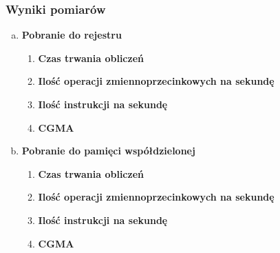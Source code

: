 \subsubsection{Wyniki pomiarów}

\begin{enumerate}[(a)]

\item \textbf{Pobranie do rejestru} \newline

\begin{enumerate}[1.]

\item \textbf{Czas trwania obliczeń} \newline

\item \textbf{Ilość operacji zmiennoprzecinkowych na sekundę} \newline

\item \textbf{Ilość instrukcji na sekundę} \newline

\item \textbf{CGMA} \newline

\end{enumerate}

\item \textbf{Pobranie do pamięci współdzielonej} \newline

\begin{enumerate}[1.]

\item \textbf{Czas trwania obliczeń} \newline

\item \textbf{Ilość operacji zmiennoprzecinkowych na sekundę} \newline

\item \textbf{Ilość instrukcji na sekundę} \newline

\item \textbf{CGMA} \newline

\end{enumerate}

\end{enumerate}
